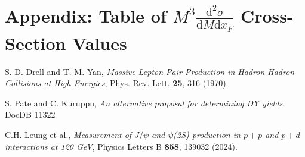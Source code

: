 \documentclass[11pt]{article}
\newcommand{\diffd}{\mathrm{d}}
\begin{document}

\clearpage


\section{Appendix: Table of $M^{3}\frac{\diffd^{2}\sigma}{\diffd M \diffd x_{F}}$ Cross-Section Values}
\label{app:xsec_table}


\clearpage
\begin{thebibliography}{99}
    S. D. Drell and T.-M. Yan,
    \textit{Massive Lepton-Pair Production in Hadron-Hadron Collisions at High Energies},
    Phys. Rev. Lett. \textbf{25}, 316 (1970).

     S. Pate and C. Kuruppu, 
    \textit{An alternative proposal for determining DY yields}, DocDB 11322

    C.H. Leung et al., \textit{Measurement of $J/\psi$ and $\psi$(2S) production in $p + p$ and $p + d$ interactions at 120 GeV},
    Physics Letters B \textbf{858}, 139032 (2024).
 
\end{thebibliography}
\end{document}
